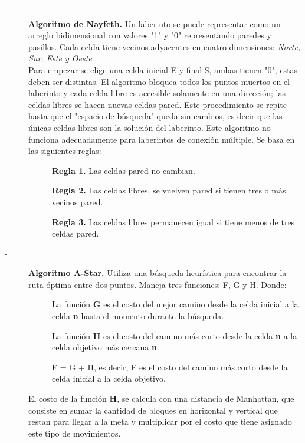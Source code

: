 \begin{description}
    \item[-]\textbf{Algoritmo de Nayfeth.} Un laberinto se puede representar como un arreglo bidimensional con valores "1" y "0" representando paredes y pasillos. Cada celda tiene vecinos adyacentes en cuatro dimensiones: \textit{Norte, Sur, Este y Oeste}.\\
    Para empezar se elige una celda inicial E y final S, ambas tienen "0", estas deben ser distintas. El algoritmo bloquea todos los puntos muertos en el laberinto y cada celda libre es accesible solamente en una dirección; las celdas libres se hacen nuevas celdas pared. Este procedimiento se repite hasta que el "espacio de búsqueda" queda sin cambios, es decir que las únicas celdas libres son la solución del laberinto. Este algoritmo no funciona adecuadamente para laberintos de conexión múltiple. Se basa en las siguientes reglas: 
    \begin{description}
        \item[ ]\textbf{Regla 1.} Las celdas pared no cambian.
        \item[ ]\textbf{Regla 2.} Las celdas libres, se vuelven pared si tienen tres o más vecinos pared.
        \item[ ]\textbf{Regla 3.} Las celdas libres permanecen igual si tiene menos de tres celdas pared.
    \end{description}
    
    \item[-]\textbf{Algoritmo A-Star.} Utiliza una búsqueda heurística para encontrar la ruta óptima entre dos puntos. Maneja tres funciones: F, G y H. Donde:
    \begin{description}
        \item[ ] La función \textbf{G} es el costo del mejor camino desde la celda inicial a la celda \textbf{n} hasta el momento durante la búsqueda.
        \item[ ] La función \textbf{H} es el costo del camino más corto desde la celda \textbf{n} a la celda objetivo más cercana \textbf{n}.
        \item [ ] F = G + H, es decir,  F es el costo del camino más corto desde la celda inicial a la celda objetivo.
    \end{description}
    \noindent El costo de la función \textbf{H}, se calcula con una distancia de Manhattan, que consiste en sumar la cantidad de bloques en horizontal y vertical que restan para llegar a la meta y multiplicar por el costo que tiene asignado este tipo de movimientos.
\end{description}


\newpage